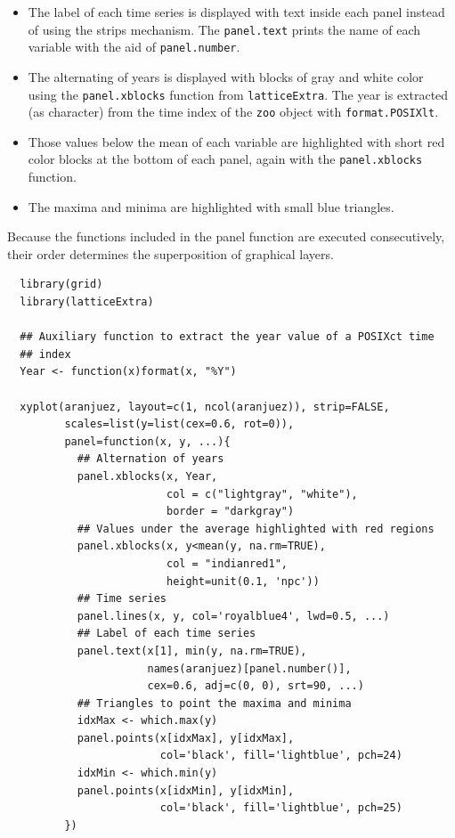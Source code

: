 \documentclass[smallroyalvopaper]{memoir}
\begin{document}
\begin{itemize}
\item The label of each time series is displayed with text inside each
panel instead of using the strips mechanism. The \texttt{panel.text}
prints the name of each variable with the aid of \texttt{panel.number}.
\item The alternating of years is displayed with blocks of gray and
white color using the \texttt{panel.xblocks} function from
\texttt{latticeExtra}. The year is extracted (as character) from the
time index of the \texttt{zoo} object with \texttt{format.POSIXlt}.
\item Those values below the mean of each variable are highlighted
with short red color blocks at the bottom of each panel, again
with the \texttt{panel.xblocks} function.
\item The maxima and minima are highlighted with small blue triangles.
\end{itemize}

Because the functions included in the panel function are executed
consecutively, their order determines the superposition of graphical
layers.

\lstset{language=r,label= ,caption= ,captionpos=b,numbers=none}
\begin{lstlisting}
  library(grid)
  library(latticeExtra)
  
  ## Auxiliary function to extract the year value of a POSIXct time
  ## index
  Year <- function(x)format(x, "%Y")
  
  xyplot(aranjuez, layout=c(1, ncol(aranjuez)), strip=FALSE,
         scales=list(y=list(cex=0.6, rot=0)),
         panel=function(x, y, ...){
           ## Alternation of years
           panel.xblocks(x, Year,
                         col = c("lightgray", "white"),
                         border = "darkgray")
           ## Values under the average highlighted with red regions
           panel.xblocks(x, y<mean(y, na.rm=TRUE),
                         col = "indianred1",
                         height=unit(0.1, 'npc'))
           ## Time series
           panel.lines(x, y, col='royalblue4', lwd=0.5, ...)
           ## Label of each time series
           panel.text(x[1], min(y, na.rm=TRUE),
                      names(aranjuez)[panel.number()],
                      cex=0.6, adj=c(0, 0), srt=90, ...)
           ## Triangles to point the maxima and minima 
           idxMax <- which.max(y)
           panel.points(x[idxMax], y[idxMax],
                        col='black', fill='lightblue', pch=24)
           idxMin <- which.min(y)
           panel.points(x[idxMin], y[idxMin],
                        col='black', fill='lightblue', pch=25)
         })
\end{lstlisting}
\end{document}
